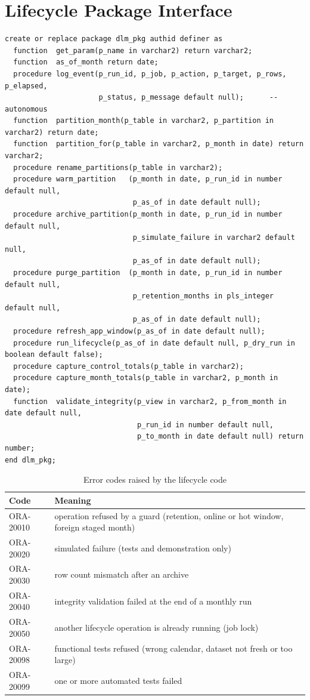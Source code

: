 \chapter{Lifecycle Package Interface}

\needspace{0.3\textheight}
\begin{lstlisting}[style=sql, caption={Specification of \code{DLM\_PKG} (abridged)}]
create or replace package dlm_pkg authid definer as
  function  get_param(p_name in varchar2) return varchar2;
  function  as_of_month return date;
  procedure log_event(p_run_id, p_job, p_action, p_target, p_rows, p_elapsed,
                      p_status, p_message default null);      -- autonomous
  function  partition_month(p_table in varchar2, p_partition in varchar2) return date;
  function  partition_for(p_table in varchar2, p_month in date) return varchar2;
  procedure rename_partitions(p_table in varchar2);
  procedure warm_partition   (p_month in date, p_run_id in number default null,
                              p_as_of in date default null);
  procedure archive_partition(p_month in date, p_run_id in number default null,
                              p_simulate_failure in varchar2 default null,
                              p_as_of in date default null);
  procedure purge_partition  (p_month in date, p_run_id in number default null,
                              p_retention_months in pls_integer default null,
                              p_as_of in date default null);
  procedure refresh_app_window(p_as_of in date default null);
  procedure run_lifecycle(p_as_of in date default null, p_dry_run in boolean default false);
  procedure capture_control_totals(p_table in varchar2);
  procedure capture_month_totals(p_table in varchar2, p_month in date);
  function  validate_integrity(p_view in varchar2, p_from_month in date default null,
                               p_run_id in number default null,
                               p_to_month in date default null) return number;
end dlm_pkg;
\end{lstlisting}

\begin{table}[H]
\centering
\caption{Error codes raised by the lifecycle code}
\begin{tabularx}{\linewidth}{lL}
\toprule
Code & Meaning \\
\midrule
ORA-20010 & operation refused by a guard (retention, online or hot window, foreign staged month) \\
ORA-20020 & simulated failure (tests and demonstration only) \\
ORA-20030 & row count mismatch after an archive \\
ORA-20040 & integrity validation failed at the end of a monthly run \\
ORA-20050 & another lifecycle operation is already running (job lock) \\
ORA-20098 & functional tests refused (wrong calendar, dataset not fresh or too large) \\
ORA-20099 & one or more automated tests failed \\
\bottomrule
\end{tabularx}
\end{table}

